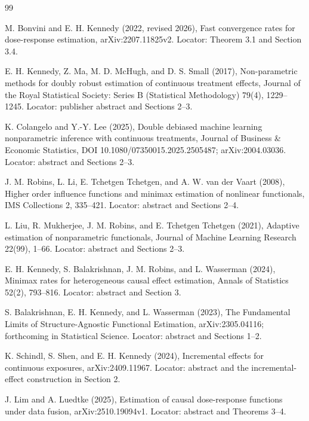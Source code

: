 \documentclass{article}
\begin{document}
\begin{thebibliography}{99}

   M. Bonvini and E. H. Kennedy (2022, revised 2026), Fast convergence rates for dose-response estimation, arXiv:2207.11825v2. Locator: Theorem 3.1 and Section 3.4.

   E. H. Kennedy, Z. Ma, M. D. McHugh, and D. S. Small (2017), Non-parametric methods for doubly robust estimation of continuous treatment effects, Journal of the Royal Statistical Society: Series B (Statistical Methodology) 79(4), 1229--1245. Locator: publisher abstract and Sections 2--3.

   K. Colangelo and Y.-Y. Lee (2025), Double debiased machine learning nonparametric inference with continuous treatments, Journal of Business \& Economic Statistics, DOI 10.1080/07350015.2025.2505487; arXiv:2004.03036. Locator: abstract and Sections 2--3.

   J. M. Robins, L. Li, E. Tchetgen Tchetgen, and A. W. van der Vaart (2008), Higher order influence functions and minimax estimation of nonlinear functionals, IMS Collections 2, 335--421. Locator: abstract and Sections 2--4.

   L. Liu, R. Mukherjee, J. M. Robins, and E. Tchetgen Tchetgen (2021), Adaptive estimation of nonparametric functionals, Journal of Machine Learning Research 22(99), 1--66. Locator: abstract and Sections 2--3.

   E. H. Kennedy, S. Balakrishnan, J. M. Robins, and L. Wasserman (2024), Minimax rates for heterogeneous causal effect estimation, Annals of Statistics 52(2), 793--816. Locator: abstract and Section 3.

   S. Balakrishnan, E. H. Kennedy, and L. Wasserman (2023), The Fundamental Limits of Structure-Agnostic Functional Estimation, arXiv:2305.04116; forthcoming in Statistical Science. Locator: abstract and Sections 1--2.

   K. Schindl, S. Shen, and E. H. Kennedy (2024), Incremental effects for continuous exposures, arXiv:2409.11967. Locator: abstract and the incremental-effect construction in Section 2.

   J. Lim and A. Luedtke (2025), Estimation of causal dose-response functions under data fusion, arXiv:2510.19094v1. Locator: abstract and Theorems 3--4.


\end{thebibliography}
\end{document}
